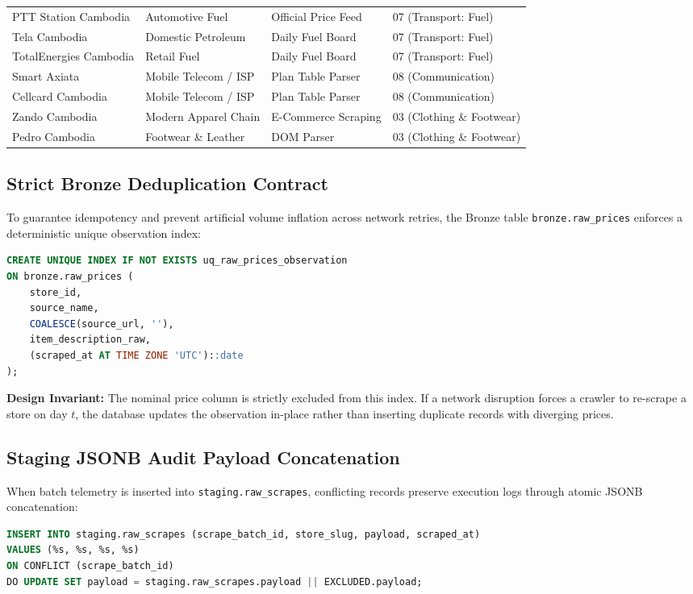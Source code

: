\documentclass[11pt,a4paper]{article}
\begin{document}
\begin{longtable}{p{4.2cm}p{3.2cm}p{3.0cm}p{3.8cm}}
PTT Station Cambodia & Automotive Fuel & Official Price Feed & 07 (Transport: Fuel) \\
Tela Cambodia & Domestic Petroleum & Daily Fuel Board & 07 (Transport: Fuel) \\
TotalEnergies Cambodia & Retail Fuel & Daily Fuel Board & 07 (Transport: Fuel) \\
Smart Axiata & Mobile Telecom / ISP & Plan Table Parser & 08 (Communication) \\
Cellcard Cambodia & Mobile Telecom / ISP & Plan Table Parser & 08 (Communication) \\
Zando Cambodia & Modern Apparel Chain & E-Commerce Scraping & 03 (Clothing \& Footwear) \\
Pedro Cambodia & Footwear \& Leather & DOM Parser & 03 (Clothing \& Footwear) \\
\bottomrule
\end{longtable}

\subsection{Strict Bronze Deduplication Contract}
To guarantee idempotency and prevent artificial volume inflation across network retries, the Bronze table \texttt{bronze.raw\_prices} enforces a deterministic unique observation index:
\begin{lstlisting}[language=SQL]
CREATE UNIQUE INDEX IF NOT EXISTS uq_raw_prices_observation 
ON bronze.raw_prices (
    store_id, 
    source_name, 
    COALESCE(source_url, ''), 
    item_description_raw, 
    (scraped_at AT TIME ZONE 'UTC')::date
);
\end{lstlisting}
\textbf{Design Invariant:} The nominal price column is strictly excluded from this index. If a network disruption forces a crawler to re-scrape a store on day $t$, the database updates the observation in-place rather than inserting duplicate records with diverging prices.

\subsection{Staging JSONB Audit Payload Concatenation}
When batch telemetry is inserted into \texttt{staging.raw\_scrapes}, conflicting records preserve execution logs through atomic JSONB concatenation:
\begin{lstlisting}[language=SQL]
INSERT INTO staging.raw_scrapes (scrape_batch_id, store_slug, payload, scraped_at)
VALUES (%s, %s, %s, %s)
ON CONFLICT (scrape_batch_id) 
DO UPDATE SET payload = staging.raw_scrapes.payload || EXCLUDED.payload;
\end{lstlisting}
\end{document}

